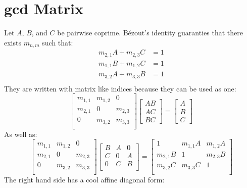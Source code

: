 
\section{gcd Matrix}
Let $A$, $B$, and $C$ be pairwise coprime.
Bézout's identity guaranties that there exists $m_{n,m}$ such that:
\[\begin{aligned}
	m_{2,1}A+m_{2,3}C&=1\\
	m_{1,1}B+m_{1,2}C&=1\\
	m_{3,2}A+m_{3,3}B&=1\\
\end{aligned}\]
They are written with matrix like indices because they can be used as one:
\[
	\begin{bmatrix}
		m_{1,1}&m_{1,2}&0\\
		m_{2,1}&0&m_{2,3}\\
		0&m_{3,2}&m_{3,3}\\
	\end{bmatrix}
	\begin{bmatrix}
		AB\\AC\\BC
	\end{bmatrix}
	=
	\begin{bmatrix}
		A\\B\\C
	\end{bmatrix}
\]
As well as:
\[
	\begin{bmatrix}
		m_{1,1}&m_{1,2}&0\\
		m_{2,1}&0&m_{2,3}\\
		0&m_{3,2}&m_{3,3}\\
	\end{bmatrix}
	\begin{bmatrix}
		B&A&0\\
		C&0&A\\
		0&C&B\\
	\end{bmatrix}
	=
	\begin{bmatrix}
		1&m_{1,1}A&m_{1,2}A\\
		m_{2,1}B&1&m_{2,3}B\\
		m_{3,2}C&m_{3,3}C&1\\
	\end{bmatrix}
\]
The right hand side has a cool affine diagonal form:

